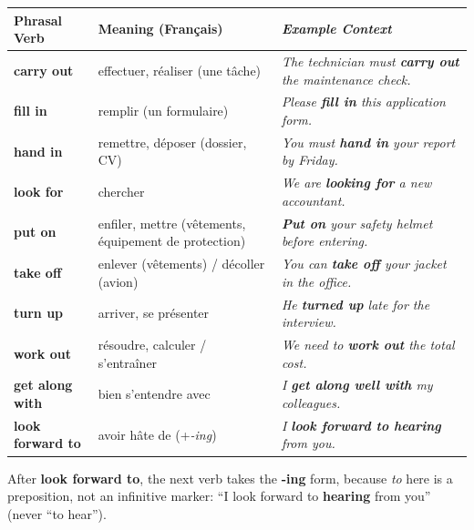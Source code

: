 \documentclass[11pt]{article}
\begin{document}
\begin{center}
\begin{tabularx}{\linewidth}{|>{\bfseries}l|X|>{\itshape}X|}\hline
\rowcolor{popblueL}\textnormal{\textbf{Phrasal Verb}} & \textnormal{\textbf{Meaning (Français)}} & \textnormal{\textbf{Example Context}} \\ \hline
carry out & effectuer, réaliser (une tâche) & The technician must \textbf{carry out} the maintenance check. \\ \hline
fill in & remplir (un formulaire) & Please \textbf{fill in} this application form. \\ \hline
hand in & remettre, déposer (dossier, CV) & You must \textbf{hand in} your report by Friday. \\ \hline
look for & chercher & We are \textbf{looking for} a new accountant. \\ \hline
put on & enfiler, mettre (vêtements, équipement de protection) & \textbf{Put on} your safety helmet before entering. \\ \hline
take off & enlever (vêtements) / décoller (avion) & You can \textbf{take off} your jacket in the office. \\ \hline
turn up & arriver, se présenter & He \textbf{turned up} late for the interview. \\ \hline
work out & résoudre, calculer / s'entraîner & We need to \textbf{work out} the total cost. \\ \hline
get along with & bien s'entendre avec & I \textbf{get along well with} my colleagues. \\ \hline
look forward to & avoir hâte de (+\emph{-ing}) & I \textbf{look forward to hearing} from you. \\ \hline
\end{tabularx}
\end{center}

\begin{attention}
After \textbf{look forward to}, the next verb takes the \textbf{-ing} form, because \emph{to} here is a preposition, not an infinitive marker: ``I look forward to \textbf{hearing} from you'' (never ``to hear'').
\end{attention}
\end{document}
